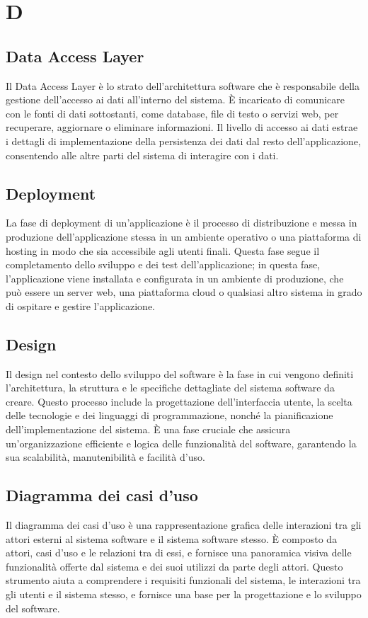 \section*{D} 
\subsection*{Data Access Layer} 
Il Data Access Layer è lo strato dell'architettura software che è responsabile della gestione dell'accesso ai dati all'interno del sistema. È incaricato di comunicare con le fonti di dati sottostanti, come database, file di testo o servizi web, per recuperare, aggiornare o eliminare informazioni. Il livello di accesso ai dati estrae i dettagli di implementazione della persistenza dei dati dal resto dell'applicazione, consentendo alle altre parti del sistema di interagire con i dati.
\subsection*{Deployment} 
La fase di deployment di un'applicazione è il processo di distribuzione e messa in produzione dell'applicazione stessa in un ambiente operativo o una piattaforma di hosting in modo che sia accessibile agli utenti finali. Questa fase segue il completamento dello sviluppo e dei test dell'applicazione; in questa fase, l'applicazione viene installata e configurata in un ambiente di produzione, che può essere un server web, una piattaforma cloud o qualsiasi altro sistema in grado di ospitare e gestire l'applicazione.
\subsection*{Design} 
Il design nel contesto dello sviluppo del software è la fase in cui vengono definiti l'architettura, la struttura e le specifiche dettagliate del sistema software da creare. Questo processo include la progettazione dell'interfaccia utente, la scelta delle tecnologie e dei linguaggi di programmazione, nonché la pianificazione dell'implementazione del sistema. È una fase cruciale che assicura un'organizzazione efficiente e logica delle funzionalità del software, garantendo la sua scalabilità, manutenibilità e facilità d'uso.
\subsection*{Diagramma dei casi d'uso} 
Il diagramma dei casi d'uso è una rappresentazione grafica delle interazioni tra gli attori esterni al sistema software e il sistema software stesso. È composto da attori, casi d'uso e le relazioni tra di essi, e fornisce una panoramica visiva delle funzionalità offerte dal sistema e dei suoi utilizzi da parte degli attori. Questo strumento aiuta a comprendere i requisiti funzionali del sistema, le interazioni tra gli utenti e il sistema stesso, e fornisce una base per la progettazione e lo sviluppo del software.
